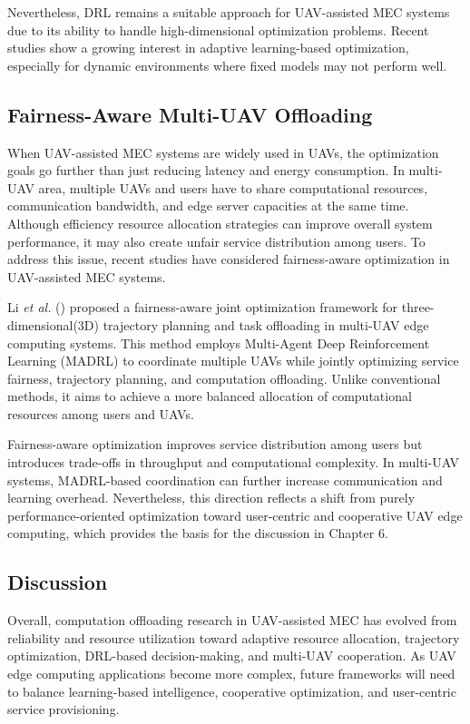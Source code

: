 \documentclass[a4paper, 12pt]{article}
\begin{document}
Nevertheless, DRL remains a suitable approach for UAV-assisted MEC systems due to its ability to handle high-dimensional optimization problems. Recent studies show a growing interest in adaptive learning-based optimization, especially for dynamic environments where fixed models may not perform well.

\subsection*{Fairness-Aware Multi-UAV Offloading}
When UAV-assisted MEC systems are widely used in UAVs, the optimization goals go further than just reducing latency and energy consumption. In multi-UAV area, multiple UAVs and users have to share computational resources, communication bandwidth, and edge server capacities at the same time. Although efficiency resource allocation strategies can improve overall system performance, it may also create unfair service distribution among users. To address this issue, recent studies have considered fairness-aware optimization in UAV-assisted MEC systems.

Li \textit{et al.} (\cite{Li2025DRCN}) proposed a fairness-aware joint optimization framework for three-dimensional(3D) trajectory planning and task offloading in multi-UAV edge computing systems. This method employs Multi-Agent Deep Reinforcement Learning (MADRL) to coordinate multiple UAVs while jointly optimizing service fairness, trajectory planning, and computation offloading. Unlike conventional methods, it aims to achieve a more balanced allocation of computational resources among users and UAVs.

Fairness-aware optimization improves service distribution among users but introduces trade-offs in throughput and computational complexity. In multi-UAV systems, MADRL-based coordination can further increase communication and learning overhead. Nevertheless, this direction reflects a shift from purely performance-oriented optimization toward user-centric and cooperative UAV edge computing, which provides the basis for the discussion in Chapter 6.

\subsection*{Discussion}
Overall, computation offloading research in UAV-assisted MEC has evolved from reliability and resource utilization toward adaptive resource allocation, trajectory optimization, DRL-based decision-making, and multi-UAV cooperation. As UAV edge computing applications become more complex, future frameworks will need to balance learning-based intelligence, cooperative optimization, and user-centric service provisioning.
\end{document}

